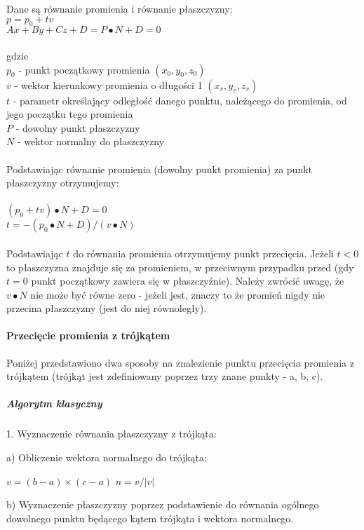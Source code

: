 Dane są równanie promienia i równanie płaszczyzny: \\
$p = p_0 + tv$ \\
$Ax + By + Cz + D = P \bullet N + D = 0$ \\
\\
gdzie
\\
$p_0$ - punkt początkowy promienia $(x_0, y_0, z_0)$ \\
$v$ - wektor kierunkowy promienia o długości 1 $(x_v, y_v, z_v)$ \\
$t$ - parametr określający odległość danego punktu, należącego do promienia, od jego początku tego promienia \\
$P$ - dowolny punkt płaszczyzny \\
$N$ - wektor normalny do płaszczyzny \\
\\
Podstawiając równanie promienia (dowolny punkt promienia) za punkt płaszczyzny otrzymujemy: \\
\\
$(p_0 + tv) \bullet N + D = 0$ \\
$t = -(p_0 \bullet N + D)/(v \bullet N)$ \\
\\
Podstawiając $t$ do równania promienia otrzymujemy punkt przecięcia. Jeżeli $t < 0$ to płaszczyzna znajduje się za promieniem, w przeciwnym przypadku przed (gdy $t = 0$ punkt początkowy zawiera się w płaszczyźnie). Należy zwrócić uwagę, że $v \bullet N$ nie może być równe zero - jeżeli jest, znaczy to że promień nigdy nie przecina płaszczyzny (jest do niej równoległy).

\paragraph{Przecięcie promienia z trójkątem}

Poniżej przedstawiono dwa sposoby na znalezienie punktu przecięcia promienia z trójkątem (trójkąt jest zdefiniowany poprzez trzy znane punkty - a, b, c).

\subparagraph{Algorytm klasyczny}

1. Wyznaczenie równania płaszczyzny z trójkąta:

a) Obliczenie wektora normalnego do trójkąta:

	$v = (b - a) \times (c - a)$
	$n = v/|v|$

b) Wyznaczenie płaszczyzny poprzez podstawienie do równania ogólnego  dowolnego punktu będącego kątem trójkąta i wektora normalnego.

